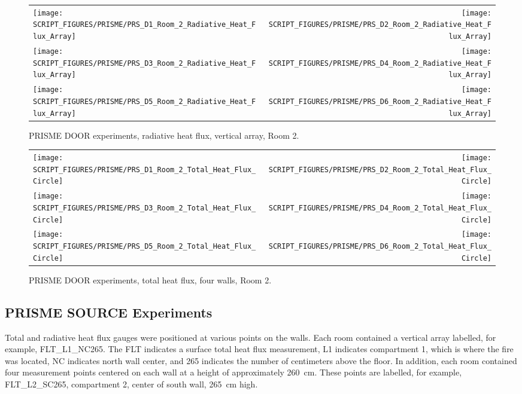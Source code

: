 \begin{figure}[p]
\begin{tabular*}{\textwidth}{l@{\extracolsep{\fill}}r}
\texttt{[image: SCRIPT\_FIGURES/PRISME/PRS\_D1\_Room\_2\_Radiative\_Heat\_Flux\_Array]} &
\texttt{[image: SCRIPT\_FIGURES/PRISME/PRS\_D2\_Room\_2\_Radiative\_Heat\_Flux\_Array]} \\
\texttt{[image: SCRIPT\_FIGURES/PRISME/PRS\_D3\_Room\_2\_Radiative\_Heat\_Flux\_Array]} &
\texttt{[image: SCRIPT\_FIGURES/PRISME/PRS\_D4\_Room\_2\_Radiative\_Heat\_Flux\_Array]} \\
\texttt{[image: SCRIPT\_FIGURES/PRISME/PRS\_D5\_Room\_2\_Radiative\_Heat\_Flux\_Array]} &
\texttt{[image: SCRIPT\_FIGURES/PRISME/PRS\_D6\_Room\_2\_Radiative\_Heat\_Flux\_Array]}
\end{tabular*}
\caption{PRISME DOOR experiments, radiative heat flux, vertical array, Room 2.}
\label{PRISME_Wall_Array_RHF_Room_2}
\end{figure}

\begin{figure}[p]
\begin{tabular*}{\textwidth}{l@{\extracolsep{\fill}}r}
\texttt{[image: SCRIPT\_FIGURES/PRISME/PRS\_D1\_Room\_2\_Total\_Heat\_Flux\_Circle]} &
\texttt{[image: SCRIPT\_FIGURES/PRISME/PRS\_D2\_Room\_2\_Total\_Heat\_Flux\_Circle]} \\
\texttt{[image: SCRIPT\_FIGURES/PRISME/PRS\_D3\_Room\_2\_Total\_Heat\_Flux\_Circle]} &
\texttt{[image: SCRIPT\_FIGURES/PRISME/PRS\_D4\_Room\_2\_Total\_Heat\_Flux\_Circle]} \\
\texttt{[image: SCRIPT\_FIGURES/PRISME/PRS\_D5\_Room\_2\_Total\_Heat\_Flux\_Circle]} &
\texttt{[image: SCRIPT\_FIGURES/PRISME/PRS\_D6\_Room\_2\_Total\_Heat\_Flux\_Circle]}
\end{tabular*}
\caption{PRISME DOOR experiments, total heat flux, four walls, Room 2.}
\label{PRISME_Wall_Circle_THF_Room_2}
\end{figure}



\clearpage


\subsection{PRISME SOURCE Experiments}

Total and radiative heat flux gauges were positioned at various points on the walls. Each room contained a vertical array labelled, for example, FLT\_L1\_NC265. The FLT indicates a surface total heat flux measurement, L1 indicates compartment 1, which is where the fire was located, NC indicates north wall center, and 265 indicates the number of centimeters above the floor. In addition, each room contained four measurement points centered on each wall at a height of approximately 260~cm. These points are labelled, for example, FLT\_L2\_SC265, compartment 2, center of south wall, 265~cm high.

